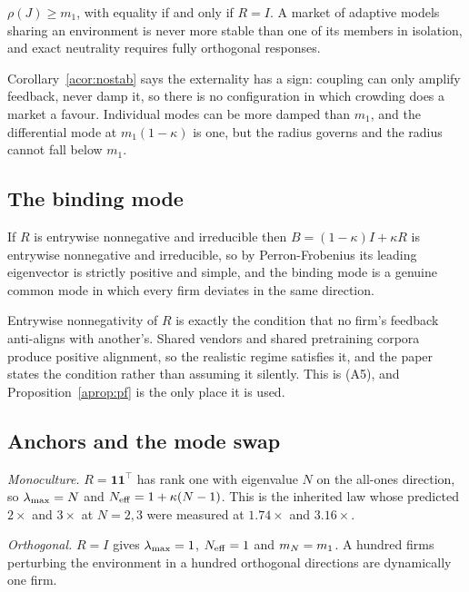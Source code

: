 \begin{acorollary}
\label{acor:nostab}
$\rho(J) \geq m_1$, with equality if and only if $R=I$. A market of adaptive models sharing an environment is never more stable than one of its members in isolation, and exact neutrality requires fully orthogonal responses.
\end{acorollary}

Corollary~\ref{acor:nostab} says the externality has a sign: coupling can only amplify feedback, never damp it, so there is no configuration in which crowding does a market a favour. Individual modes can be more damped than $m_1$, and the differential mode at $m_1(1-\kappa)$ is one, but the radius governs and the radius cannot fall below $m_1$.

\subsection{The binding mode}

\begin{aproposition}
\label{aprop:pf}
If $R$ is entrywise nonnegative and irreducible then $B=(1-\kappa)I+\kappa R$ is entrywise nonnegative and irreducible, so by Perron-Frobenius its leading eigenvector is strictly positive and simple, and the binding mode is a genuine common mode in which every firm deviates in the same direction.
\end{aproposition}

Entrywise nonnegativity of $R$ is exactly the condition that no firm's feedback anti-aligns with another's. Shared vendors and shared pretraining corpora produce positive alignment, so the realistic regime satisfies it, and the paper states the condition rather than assuming it silently. This is (A5), and Proposition~\ref{aprop:pf} is the only place it is used.

\subsection{Anchors and the mode swap}

\emph{Monoculture.} $R=\mathbf{1}\mathbf{1}^{\top}$ has rank one with eigenvalue $N$ on the all-ones direction, so $\lambda_{\max}=N$ and $N_{\mathrm{eff}} = 1+\kappa(N-1)$. This is the inherited law whose predicted $2\times$ and $3\times$ at $N=2,3$ were measured at $1.74\times$ and $3.16\times$.

\emph{Orthogonal.} $R=I$ gives $\lambda_{\max}=1$, $N_{\mathrm{eff}}=1$ and $m_N = m_1$. A hundred firms perturbing the environment in a hundred orthogonal directions are dynamically one firm.

